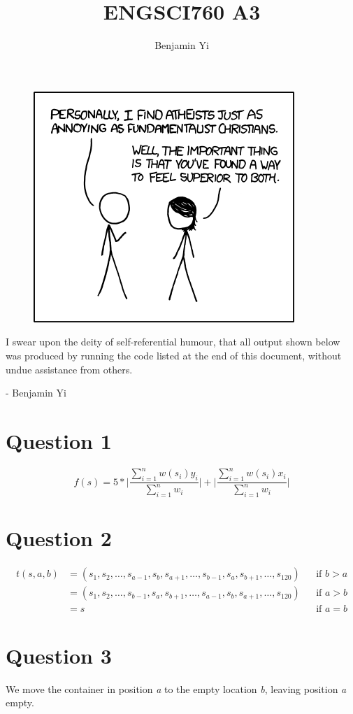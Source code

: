\documentclass[10pt,a4paper]{article}
\begin{document}
\title{ENGSCI760 A3}
\author{Benjamin Yi}

\begin{figure}[H]
	\centering
	\includegraphics[width=0.5\linewidth]{atheists}
\end{figure}

I swear upon the deity of self-referential humour, that all output shown below was produced by running the code listed at the end of this document, without undue assistance from others.
\begin{flushright}
	- Benjamin Yi
\end{flushright}
\newpage

\section*{Question 1}
\begin{equation*}
f(s) = 5*\bigg| \frac{\sum^n_{i=1} w(s_i)y_i}{\sum^n_{i=1}w_i} \bigg| + \bigg| \frac{\sum^n_{i=1} w(s_i)x_i}{\sum^n_{i=1}w_i} \bigg|
\end{equation*}

\section*{Question 2}
\begin{align*}
t(s, a, b) &= (s_1, s_2, \dots , s_{a-1}, s_b, s_{a+1}, \dots, s_{b-1}, s_a, s_{b+1}, \dots, s_{120}) && \text{if } b > a \\
 &= (s_1, s_2, \dots , s_{b-1}, s_a, s_{b+1}, \dots, s_{a-1}, s_b, s_{a+1}, \dots, s_{120}) && \text{if } a > b \\
&= s && \text{if } a = b
\end{align*}

\section*{Question 3}
We move the container in position \textit{a} to the empty location \textit{b}, leaving position \textit{a} empty.
\end{document}
